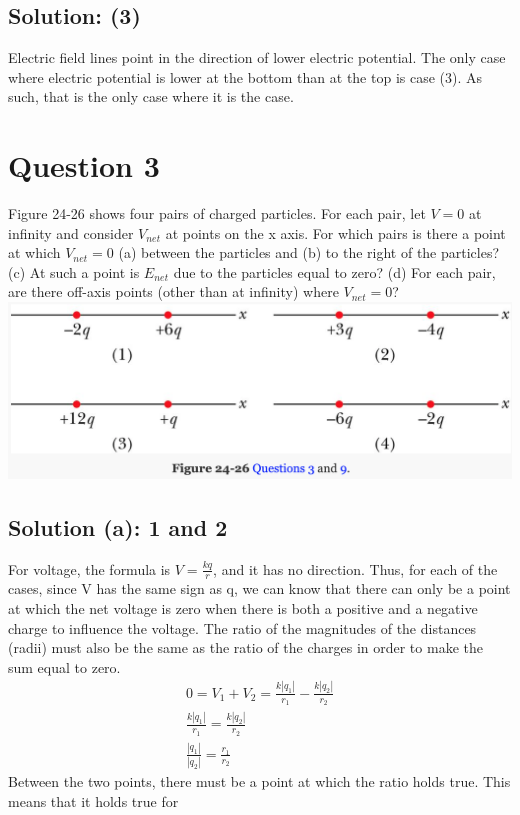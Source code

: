 \documentclass[12pt]{article}
\begin{document}
\subsection{Solution: (3)}
Electric field lines point in the direction of lower electric potential.
The only case where electric potential is lower at the bottom than at the top is case (3).
As such, that is the only case where it is the case.
\pagebreak

\section{Question 3}
Figure 24-26 shows four pairs of charged particles. For each pair, let $V = 0$ at infinity and consider $V_{net}$ at points on the x axis. For which pairs is there a point at which $V_{net} = 0$ (a) between the particles and (b) to the right of the particles? (c) At such a point is $E_{net}$ due to the particles equal to zero? (d) For each pair, are there off-axis points (other than at infinity) where $V_{net} = 0$?
\includegraphics[width=\textwidth]{picture_2.png}

\subsection{Solution (a): 1 and 2}
For voltage, the formula is $V = \frac{kq}{r}$, and it has no direction. 
Thus, for each of the cases, since V has the same sign as q, we can know that there can only be a point at which the net voltage is zero when there is both a positive and a negative charge to influence the voltage.
The ratio of the magnitudes of the distances (radii) must also be the same as the ratio of the charges in order to make the sum equal to zero. 
\begin{gather*}
    0 = V_1 + V_2 = \frac{k\left|q_1\right|}{r_1} - \frac{k\left|q_2\right|}{r_2}\\
    \frac{k\left|q_1\right|}{r_1} = \frac{k\left|q_2\right|}{r_2}\\
    \frac{\left|q_1\right|}{\left|q_2\right|} = \frac{r_1}{r_2}
\end{gather*}
Between the two points, there must be a point at which the ratio holds true. 
This means that it holds true for 
\end{document}
